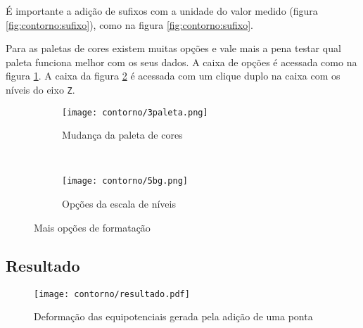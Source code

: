     \begin{lembrete}
        É importante a adição de sufixos com a unidade do valor medido (figura \ref{fig:contorno:sufixo}), como na figura \ref{fig:contorno:sufixo}.
    \end{lembrete}

    Para as paletas de cores existem muitas opções e vale mais a pena testar qual paleta funciona melhor com os seus dados. A caixa de opções é acessada como na figura \ref{fig:contorno:paleta}. A caixa da figura \ref{fig:contorno:escala} é acessada com um clique duplo na caixa com os níveis do eixo \texttt{Z}.

    \begin{figure}[H]
        \centering
        \begin{subfigure}{0.45\textwidth}
            \centering
            \texttt{[image: contorno/3paleta.png]}

            \caption{Mudança da paleta de cores}
            \label{fig:contorno:paleta}
        \end{subfigure}
        ~
        \begin{subfigure}{0.45\textwidth}
            \centering
            \texttt{[image: contorno/5bg.png]}

            \caption{Opções da escala de níveis}
            \label{fig:contorno:escala}
        \end{subfigure}
        \caption{Mais opções de formatação}
        \label{fig:contorno:extra}
    \end{figure}

\subsection{Resultado}

    \begin{figure}[htbp]
        \centering
        \texttt{[image: contorno/resultado.pdf]}

        \caption{Deformação das equipotenciais gerada pela adição de uma ponta}
        \label{fig:contorno:final}
    \end{figure}

